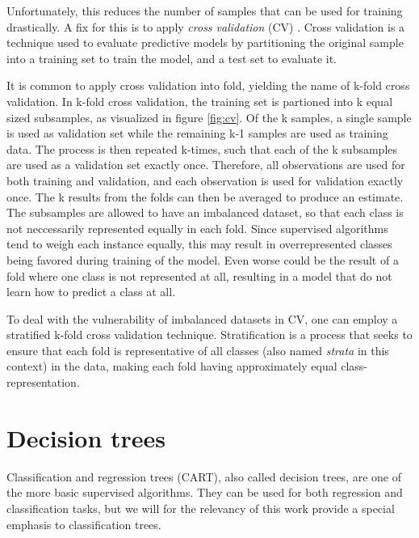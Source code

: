Unfortunately, this reduces the number of samples that can be used for training drastically. A fix for this is to apply \textit{cross validation} (CV) \cite{Murphy2012}. Cross validation is a technique used to evaluate predictive models by partitioning the original sample into a training set to train the model, and a test set to evaluate it.


\noindent It is common to apply cross validation into fold, yielding the name of k-fold cross validation. In k-fold cross validation, the training set is partioned into k equal sized subsamples, as visualized in figure \ref{fig:cv}. Of the k samples, a single sample is used as validation set while the remaining k-1 samples are used as training data. The process is then repeated k-times, such that each of the k subsamples are used as a validation set exactly once. Therefore, all observations are used for both training and validation, and each observation is used for validation exactly once. The k results from the folds can then be averaged to produce an estimate. The subsamples are allowed to have an imbalanced dataset, so that each class is not neccessarily represented equally in each fold. Since supervised algorithms tend to weigh each instance equally, this may result in overrepresented classes being favored during training of the model. Even worse could be the result of a fold where one class is not represented at all, resulting in a model that do not learn how to predict a class at all.

To deal with the vulnerability of imbalanced datasets in CV, one can employ a stratified k-fold cross validation technique. Stratification is a process that seeks to ensure that each fold is representative of all classes (also named \textit{strata} in this context) in the data, making each fold having approximately equal class-representation.

\section{Decision trees}
Classification and regression trees (CART), also called decision trees, are one of the more basic supervised algorithms. They can be used for both regression and classification tasks, but we will for the relevancy of this work provide a special emphasis to classification trees.  %

